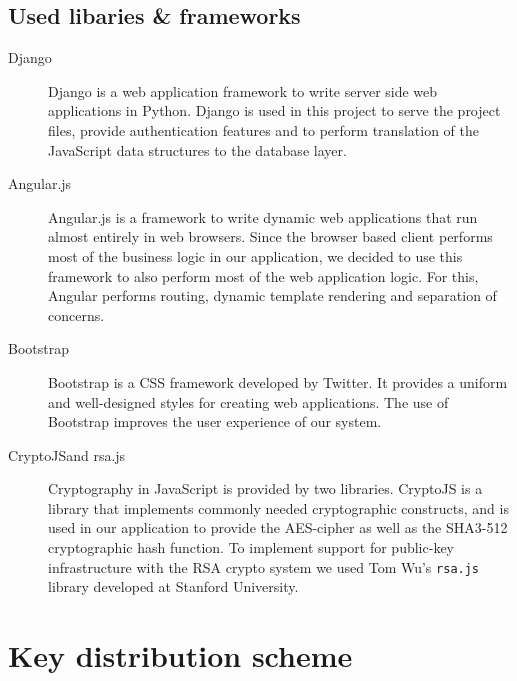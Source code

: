 \documentclass[a4paper]{article}
\begin{document}
    \subsection{Used libaries \& frameworks} \label{sec:frameworks}
    \begin{description}
    	\item[Django\footnotemark]
        	Django is a web application framework to write server side web applications in Python. Django is used in this project to serve the project files, provide authentication features and to perform translation of the JavaScript data structures to the database layer.
        
        \item[Angular.js\footnotemark]
        	Angular.js is a framework to write dynamic web applications that run almost entirely in web browsers. Since the browser based client performs most of the business logic in our application, we decided to use this framework to also perform most of the web application logic. For this, Angular performs routing, dynamic template rendering and separation of concerns.
            
        \item[Bootstrap\footnotemark]
			Bootstrap is a CSS framework developed by Twitter. It provides a uniform and well-designed styles for creating web applications. The use of Bootstrap improves the user experience of our system.
        
        \item[CryptoJS\footnotemark and rsa.js\footnotemark]
        Cryptography in JavaScript is provided by two libraries. CryptoJS is a library that implements commonly needed cryptographic constructs, and is used in our application to provide the AES-cipher as well as the SHA3-512 cryptographic hash function. To implement support for public-key infrastructure with the RSA crypto system we used Tom Wu's \texttt{rsa.js} library developed at Stanford University.
    \end{description}
            
            
\section{Key distribution scheme}
\end{document}
